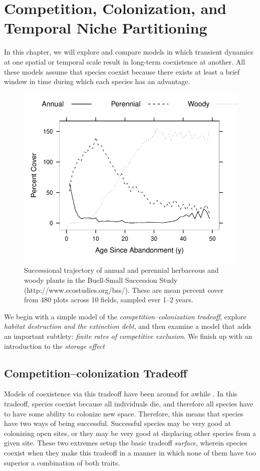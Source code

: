 
 \chapter{Competition, Colonization, and Temporal Niche Partitioning}
In this chapter, we will explore and compare models in which transient dynamics at one spatial or temporal scale
result in long-term coexistence at another. All these models assume that
species coexist because there exists at least a brief window in
time during which each species has an advantage. 

\begin{figure}[h]
  \centering
  \includegraphics[width=.5\linewidth]{BSsuccFig}
  \caption{Successional trajectory of annual and perennial herbaceous and woody plants in the Buell-Small Succession Study (http://www.ecostudies.org/bss/). These are mean percent cover from 480 plots across 10 fields, sampled ever 1--2 years.}
  \label{fig:bssucc}
\end{figure}

 We begin with a simple model of the \emph{competition--colonization
   tradeoff}, explore \emph{habitat destruction and the extinction
   debt}, and then examine a model that adds an important subtlety:
 \emph{finite rates of competitive exclusion}. We finish up with an
 introduction to the \emph{storage effect}

\section{Competition--colonization Tradeoff}
Models of coexistence via this tradeoff have been around for awhile \cite{Skellam:1951vn,Levins:1971ve,Horn:1972fk,Armstrong:1976ys, Hastings:1980kx,Shmida1984, Levin:1984uq}. In this tradeoff, species coexist because all individuals die, and therefore all species have to have some ability to colonize new space. Therefore, this means that species have two ways of being successful. Successful species may be very good at colonizing open sites, or they may be very good at displacing other species from a given site. These two extremes setup the basic tradeoff \emph{surface}, wherein species coexist when they make this tradeoff in a manner in which none of them have too superior a combination of both traits. 

